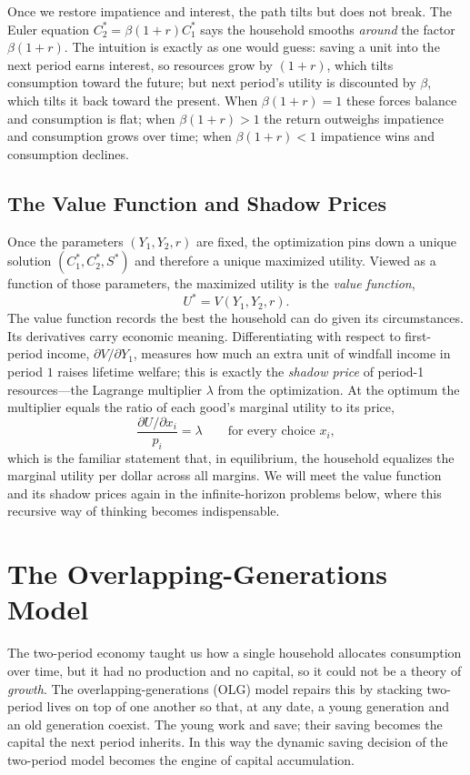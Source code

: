 Once we restore impatience and interest, the path tilts but does not break. The Euler equation $C_2^* = \beta(1+r)C_1^*$ says the household smooths \emph{around} the factor $\beta(1+r)$. The intuition is exactly as one would guess: saving a unit into the next period earns interest, so resources grow by $(1+r)$, which tilts consumption toward the future; but next period's utility is discounted by $\beta$, which tilts it back toward the present. When $\beta(1+r) = 1$ these forces balance and consumption is flat; when $\beta(1+r) > 1$ the return outweighs impatience and consumption grows over time; when $\beta(1+r) < 1$ impatience wins and consumption declines.

\subsection{The Value Function and Shadow Prices}

Once the parameters $(Y_1, Y_2, r)$ are fixed, the optimization pins down a unique solution $(C_1^*, C_2^*, S^*)$ and therefore a unique maximized utility. Viewed as a function of those parameters, the maximized utility is the \emph{value function},
\[
U^* = V(Y_1, Y_2, r).
\]
The value function records the best the household can do given its circumstances. Its derivatives carry economic meaning. Differentiating with respect to first-period income, $\partial V / \partial Y_1$, measures how much an extra unit of windfall income in period $1$ raises lifetime welfare; this is exactly the \emph{shadow price} of period-1 resources---the Lagrange multiplier $\lambda$ from the optimization. At the optimum the multiplier equals the ratio of each good's marginal utility to its price,
\[
\frac{\partial U / \partial x_i}{p_i} = \lambda \qquad \text{for every choice } x_i,
\]
which is the familiar statement that, in equilibrium, the household equalizes the marginal utility per dollar across all margins. We will meet the value function and its shadow prices again in the infinite-horizon problems below, where this recursive way of thinking becomes indispensable.

\section{The Overlapping-Generations Model}

The two-period economy taught us how a single household allocates consumption over time, but it had no production and no capital, so it could not be a theory of \emph{growth}. The overlapping-generations (OLG) model repairs this by stacking two-period lives on top of one another so that, at any date, a young generation and an old generation coexist. The young work and save; their saving becomes the capital the next period inherits. In this way the dynamic saving decision of the two-period model becomes the engine of capital accumulation.

